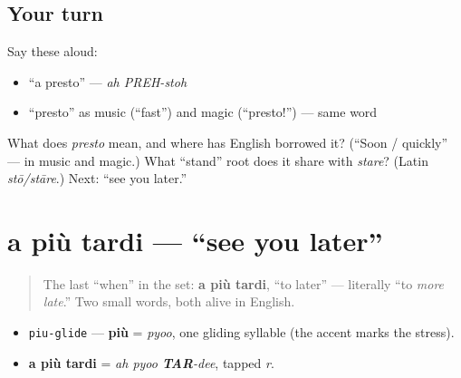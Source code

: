 \subsection*{Your turn}
Say these aloud:

\begin{itemize}
\raggedright
  \item \textquotedblleft{}a presto\textquotedblright{} — \emph{ah PREH-stoh}
  \item \textquotedblleft{}presto\textquotedblright{} as music (\textquotedblleft{}fast\textquotedblright{}) and magic (\textquotedblleft{}presto!\textquotedblright{}) — same word
\end{itemize}

\begin{tcolorbox}[breakable,colback=teal!4,colframe=teal!35!black,title={Before you move on}]
What does \emph{presto} mean, and where has English borrowed it? (\textquotedblleft{}Soon / quickly\textquotedblright{} — in music and magic.) What \textquotedblleft{}stand\textquotedblright{} root does it share with \emph{stare}? (Latin \emph{stō/stāre}.) Next: \textquotedblleft{}see you later.\textquotedblright{}
\end{tcolorbox}
\section[a più tardi]{a più tardi — \textquotedblleft{}see you later\textquotedblright{}}

\label{lesson:IT-C04-a-piu-tardi}



\begin{quote}
The last \textquotedblleft{}when\textquotedblright{} in the set: \textbf{a più tardi}, \textquotedblleft{}to later\textquotedblright{} — literally \textquotedblleft{}to \emph{more late}.\textquotedblright{} Two small words, both alive in English.
\end{quote}

\begin{sounds}
\begin{itemize}
\raggedright
  \item \texttt{piu-glide} — \textbf{più} = \emph{pyoo}, one gliding syllable (the accent marks the stress).
  \item \textbf{a più tardi} = \emph{ah pyoo \textbf{TAR}-dee}, tapped \emph{r}.
\end{itemize}
\end{sounds}

